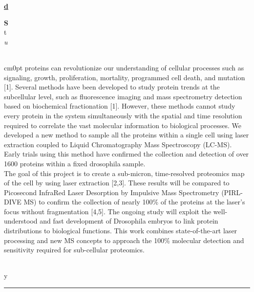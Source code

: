 \documentclass[titlepage,oneside,openany,10pt]{book}
\newenvironment{posterabswrefwfig}[8] %
        {
        \newcommand{\posterref}{#5}
	\FPeval{\cutw}{clip(16.7-#7)}
	\FPeval{\cutl}{round(#8/0.35+1,3)}
	\begin{flushright}
                \underline{\textbf{#4}}
        \end{flushright}
        \textbf{#1}\\%
        #2\\%
        \textit{#3}\\\\%
        \def\windowpagestuff{\centering
                \texttt{[image: \#6]}
	}
        \opencutright
        \begin{cutout}{0}{\cutw cm}{0pt}{\RoundingUpFunction{\cutl}}
        \noindent
	}
	{
	\end{cutout}
	\vspace{0.5cm}
	\\\noindent \posterref \\ \noindent\rule{15cm}{0.5pt}%
        }
\begin{document}
\begin{posterabswrefwfig}
	Studying proteins can revolutionize our understanding of cellular processes such as signaling, growth, proliferation, mortality, programmed cell death, and mutation {[}1{]}. Several methods have been developed to study protein trends at the subcellular level, such as fluorescence imaging and mass spectrometry detection based on biochemical fractionation {[}1{]}. However, these methods cannot study every protein in the system simultaneously with the spatial and time resolution required to correlate the vast molecular information to biological processes. We developed a new method to sample all the proteins within a single cell using laser extraction coupled to Liquid Chromatography Mass Spectroscopy (LC-MS). Early trials using this method have confirmed the collection and detection of over 1600 proteins within a fixed drosophila sample.\\The goal of this project is to create a sub-micron, time-resolved proteomics map of the cell by using laser extraction {[}2,3{]}. These results will be compared to Picosecond InfraRed Laser Desorption by Impulsive Mass Spectrometry (PIRL-DIVE MS) to confirm the collection of nearly 100\% of the proteins at the laser's focus without fragmentation {[}4,5{]}. The ongoing study will exploit the well-understood and fast development of Drosophila embryos to link protein distributions to biological functions. This work combines state-of-the-art laser processing and new MS concepts to approach the 100\% molecular detection and sensitivity required for sub-cellular proteomics.
	\label{WainwrightA}
\end{posterabswrefwfig}

\newpage
\end{document}

